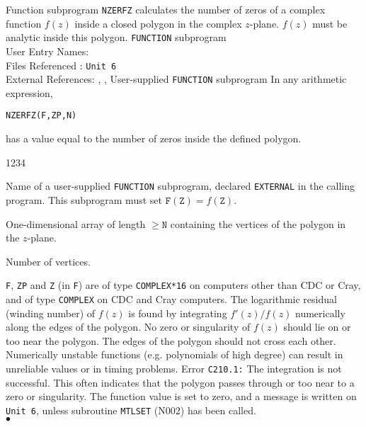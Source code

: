               
         
\Submitter{ }                    
Function subprogram {\tt NZERFZ} calculates the number of zeros
of a complex function $f(z)$ inside a closed polygon in the complex
$z$-plane. $f(z)$ must be analytic inside this polygon.
\Structure
{\tt FUNCTION} subprogram \\
User Entry Names:   \\
Files Referenced : {\tt Unit 6} \\
External References: , ,
User-supplied {\tt FUNCTION} subprogram
\Usage
In any arithmetic expression,
\begin{center}
{\tt NZERFZ(F,ZP,N)}
\end{center}
has a value equal to the number of zeros inside the defined polygon.
\begin{DLtt}{1234}
\item[F] Name of a user-supplied {\tt FUNCTION} subprogram, declared
{\tt EXTERNAL} in the calling program. This subprogram must set
$\mathtt{F(Z)}= f(\mathtt{Z})$.
\item[ZP] One-dimensional array of length $\geq \mathtt{N}$ containing
the vertices of the polygon in the $z$-plane.
\item[N] Number of vertices.
\end{DLtt}
{\tt F}, {\tt ZP} and {\tt Z} (in {\tt F}) are of type {\tt COMPLEX*16}
on computers other than CDC or Cray, and of type {\tt COMPLEX}
on CDC and Cray computers.
\Method
The logarithmic residual (winding number) of $f(z)$ is found by
integrating $f'(z)/f(z)$ numerically along the edges of the polygon.
\Notes
No zero or singularity of $f(z)$ should lie on or too near the polygon.
The edges of the polygon should not cross each other.
Numerically unstable functions (e.g. polynomials of high degree)
can result in unreliable values or in timing problems.
\Errorh
Error {\tt C210.1:} The integration is not successful.
This often indicates that the polygon passes through or too
near to a zero or singularity. The function value is set to zero, and
a message is written on {\tt Unit 6}, unless subroutine {\tt MTLSET}
(N002) has been called.
\\ $\bullet$
